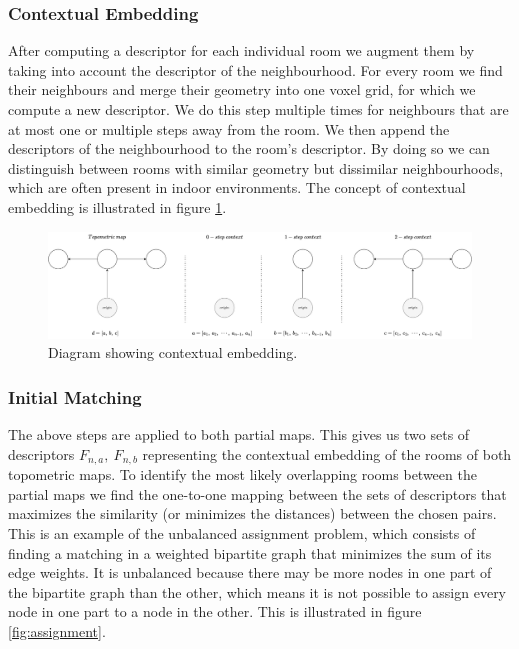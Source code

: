 \subsubsection{Contextual Embedding}
After computing a descriptor for each individual room we augment them by taking into account the descriptor of the neighbourhood. For every room we find their neighbours and merge their geometry into one voxel grid, for which we compute a new descriptor. We do this step multiple times for neighbours that are at most one or multiple steps away from the room. We then append the descriptors of the neighbourhood to the room's descriptor. By doing so we can distinguish between rooms with similar geometry but dissimilar neighbourhoods, which are often present in indoor environments. The concept of contextual embedding is illustrated in figure \ref{fig:contextual_embedding}.

\begin{figure}[h]
    \centering
    \includegraphics*[width=\textwidth]{./fig/embed_context.pdf}
    \caption{Diagram showing contextual embedding.}
    \label{fig:contextual_embedding}
\end{figure}

\subsubsection{Initial Matching}
The above steps are applied to both partial maps. This gives us two sets of descriptors \(F_{n,a},\ F_{n,b}\) representing the contextual embedding of the rooms of both topometric maps. To identify the most likely overlapping rooms between the partial maps we find the one-to-one mapping between the sets of descriptors that maximizes the similarity (or minimizes the distances) between the chosen pairs. This is an example of the unbalanced assignment problem, which consists of finding a matching in a weighted bipartite graph that minimizes the sum of its edge weights. It is unbalanced because there may be more nodes in one part of the bipartite graph than the other, which means it is not possible to assign every node in one part to a node in the other. This is illustrated in figure \ref{fig:assignment}.

